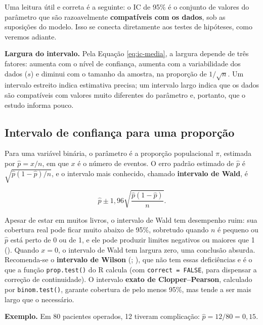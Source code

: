 \documentclass[
]{book}
\begin{document}
Uma leitura útil e correta é a seguinte: o IC de 95\% é o conjunto de valores do parâmetro que são razoavelmente \textbf{compatíveis com os dados}, sob as suposições do modelo. Isso se conecta diretamente aos testes de hipóteses, como veremos adiante.

\textbf{Largura do intervalo.} Pela Equação \eqref{eq:ic-media}, a largura depende de três fatores: aumenta com o nível de confiança, aumenta com a variabilidade dos dados (\(s\)) e diminui com o tamanho da amostra, na proporção de \(1/\sqrt{n}\). Um intervalo estreito indica estimativa precisa; um intervalo largo indica que os dados são compatíveis com valores muito diferentes do parâmetro e, portanto, que o estudo informa pouco.

\subsection{Intervalo de confiança para uma proporção}\label{intervalo-de-confianuxe7a-para-uma-proporuxe7uxe3o}

Para uma variável binária, o parâmetro é a proporção populacional \(\pi\), estimada por \(\hat{p} = x/n\), em que \(x\) é o número de eventos. O erro padrão estimado de \(\hat{p}\) é \(\sqrt{\hat{p}(1-\hat{p})/n}\), e o intervalo mais conhecido, chamado \textbf{intervalo de Wald}, é

\[
\hat{p} \pm 1{,}96\sqrt{\frac{\hat{p}(1 - \hat{p})}{n}}.
\]

Apesar de estar em muitos livros, o intervalo de Wald tem desempenho ruim: sua cobertura real pode ficar muito abaixo de 95\%, sobretudo quando \(n\) é pequeno ou \(\hat{p}\) está perto de 0 ou de 1, e ele pode produzir limites negativos ou maiores que 1 (). Quando \(x = 0\), o intervalo de Wald tem largura zero, uma conclusão absurda. Recomenda-se o \textbf{intervalo de Wilson} (; ), que não tem essas deficiências e é o que a função \texttt{prop.test()} do R calcula (com \texttt{correct\ =\ FALSE}, para dispensar a correção de continuidade). O intervalo \textbf{exato de Clopper--Pearson}, calculado por \texttt{binom.test()}, garante cobertura de pelo menos 95\%, mas tende a ser mais largo que o necessário.

\textbf{Exemplo.} Em 80 pacientes operados, 12 tiveram complicação: \(\hat{p} = 12/80 = 0{,}15\).
\end{document}
